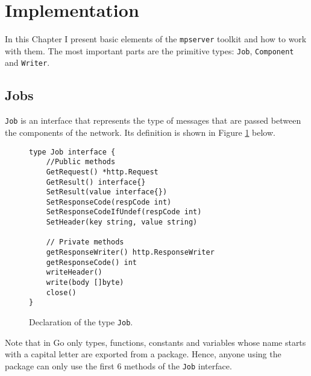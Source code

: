 \section{Implementation}
\label{sec:impl}
In this Chapter I present basic elements of the \texttt{mpserver} toolkit
and how to work with them. The most important parts are the primitive types:
\texttt{Job}, \texttt{Component} and \texttt{Writer}.

\subsection{Jobs}
\texttt{Job} is an interface that represents the type of messages that are
passed between the components of the network. Its definition is shown
in Figure \ref{fig:Job} below.

\begin{figure}[h]
\centering
\begin{lstlisting}
type Job interface {
    //Public methods
    GetRequest() *http.Request
    GetResult() interface{}
    SetResult(value interface{})
    SetResponseCode(respCode int)
    SetResponseCodeIfUndef(respCode int)
    SetHeader(key string, value string)

    // Private methods
    getResponseWriter() http.ResponseWriter
    getResponseCode() int
    writeHeader()
    write(body []byte)
    close()
}
\end{lstlisting}
\caption[scale=1.0]{Declaration of the type \texttt{Job}.}
\label{fig:Job}
\end{figure}

Note that in Go only types, functions, constants and variables whose name
starts with a capital letter are exported from a package. Hence, anyone
using the package can only use the first 6 methods of the \texttt{Job}
interface.

